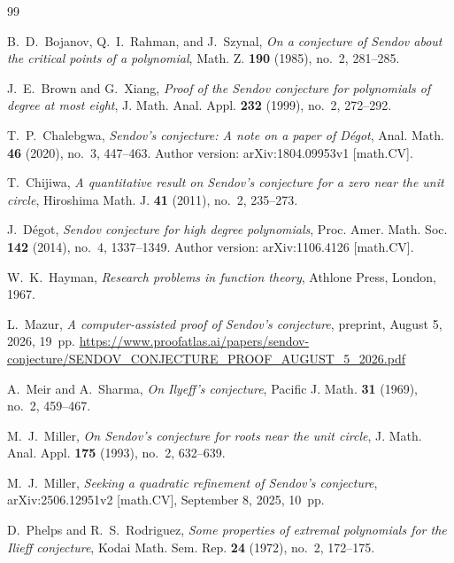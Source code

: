 \documentclass[11pt,letterpaper,reqno]{amsart}
\theoremstyle{definition}
\numberwithin{equation}{section}
\begin{document}
\begin{thebibliography}{99}
\raggedright

B.~D.~Bojanov, Q.~I.~Rahman, and J.~Szynal,
\emph{On a conjecture of Sendov about the critical points of a polynomial},
Math. Z. \textbf{190} (1985), no.~2, 281--285.

J.~E.~Brown and G.~Xiang,
\emph{Proof of the Sendov conjecture for polynomials of degree at most eight},
J. Math. Anal. Appl. \textbf{232} (1999), no.~2, 272--292.

T.~P.~Chalebgwa,
\emph{Sendov's conjecture: A note on a paper of D\'egot},
Anal. Math. \textbf{46} (2020), no.~3, 447--463.
Author version: arXiv:1804.09953v1 [math.CV].

T.~Chijiwa,
\emph{A quantitative result on Sendov's conjecture for a zero near the unit circle},
Hiroshima Math. J. \textbf{41} (2011), no.~2, 235--273.

J.~D\'egot,
\emph{Sendov conjecture for high degree polynomials},
Proc. Amer. Math. Soc. \textbf{142} (2014), no.~4, 1337--1349.
Author version: arXiv:1106.4126 [math.CV].

W.~K.~Hayman,
\emph{Research problems in function theory},
Athlone Press, London, 1967.

L.~Mazur,
\emph{A computer-assisted proof of Sendov's conjecture},
preprint, August 5, 2026, 19~pp.
\url{https://www.proofatlas.ai/papers/sendov-conjecture/SENDOV_CONJECTURE_PROOF_AUGUST_5_2026.pdf}

A.~Meir and A.~Sharma,
\emph{On Ilyeff's conjecture},
Pacific J. Math. \textbf{31} (1969), no.~2, 459--467.

M.~J.~Miller,
\emph{On Sendov's conjecture for roots near the unit circle},
J. Math. Anal. Appl. \textbf{175} (1993), no.~2, 632--639.

M.~J.~Miller,
\emph{Seeking a quadratic refinement of Sendov's conjecture},
arXiv:2506.12951v2 [math.CV], September 8, 2025, 10~pp.

D.~Phelps and R.~S.~Rodriguez,
\emph{Some properties of extremal polynomials for the Ilieff conjecture},
Kodai Math. Sem. Rep. \textbf{24} (1972), no.~2, 172--175.


\end{thebibliography}
\end{document}
